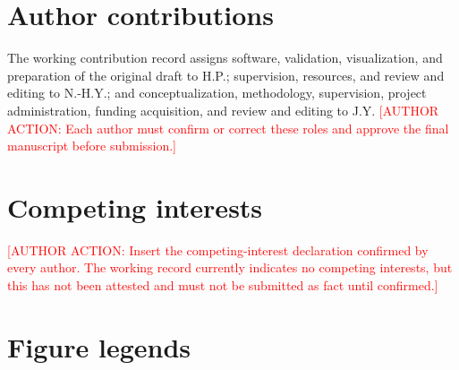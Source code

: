 \documentclass[11pt]{article}
\newcommand{\authoraction}[1]{\textcolor{red}{[AUTHOR ACTION: #1]}}
\begin{document}
\section*{Author contributions}
The working contribution record assigns software, validation, visualization, and preparation of the original draft to H.P.; supervision, resources, and review and editing to N.-H.Y.; and conceptualization, methodology, supervision, project administration, funding acquisition, and review and editing to J.Y. \authoraction{Each author must confirm or correct these roles and approve the final manuscript before submission.}

\section*{Competing interests}
\authoraction{Insert the competing-interest declaration confirmed by every author. The working record currently indicates no competing interests, but this has not been attested and must not be submitted as fact until confirmed.}

\section*{Figure legends}

\end{document}
